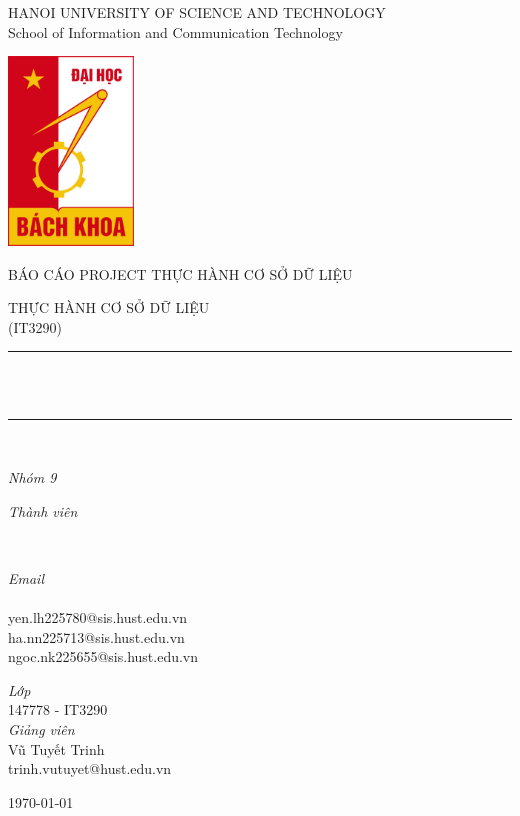 \documentclass[12pt]{article}
\makeatletter
\newcommand{\mails}{
\\ {yen.lh225780@sis.hust.edu.vn}
\\ {ha.nn225713@sis.hust.edu.vn}
\\ {ngoc.nk225655@sis.hust.edu.vn}
}
\newcommand{\class}{147778 - IT3290}
\newcommand{\lecturer}{{Vũ Tuyết Trinh}
\\trinh.vutuyet@hust.edu.vn
}
\makeatother
\begin{document}
	\newcommand{\HRule}{\rule{\linewidth}{0.3mm}} 
	\begin{center}
	    
	
  \MakeUppercase{\large Hanoi University of Science and Technology} \\[0.5cm]
   
  {\LARGE School of Information and Communication Technology} \\[0.5cm]
		{\includegraphics[width=0.25\textwidth]{hustlogo.png} \par}\vspace{0.5cm}
	\textsc	{\MakeUppercase{\Large BÁO CÁO PROJECT THỰC HÀNH CƠ SỞ DỮ LIỆU}\\[0.75cm]}
	
	\textsc	{\MakeUppercase{\large Thực hành cơ sở dữ liệu\\\normalsize (IT3290)}\\[0.5cm]}
	
	\HRule\\[0.4cm]

	{\huge\bfseries \@title}\\[0.4cm]
	\HRule\\[1.5cm]
		\begin{center}
			\large
			\textit{Nhóm 9}\\
		\end{center}
	
	\begin{minipage}{0.4\textwidth}
		\begin{flushleft}
			\large
			\textit{Thành viên}\\
			\@author
		\end{flushleft}
	\end{minipage}
	~
	\begin{minipage}{0.4\textwidth}
		\begin{flushright}
			\large
			\textit{Email}\\
	\mails 
		\end{flushright}
	\end{minipage}
\vfill\vfill
\vspace{0.3cm}
        \begin{minipage}{0.4\textwidth}
		\begin{center}
			\large
			\textit{Lớp}\\
			\class\\
			\textit{Giảng viên}\\
			\lecturer\\
		\end{center}
	\end{minipage}
\vfill\vfill
\vspace{0.3cm}
    \vfill\vfill
    \normalsize{\today}
    \\[0.3cm]


\end{center}
\end{document}
